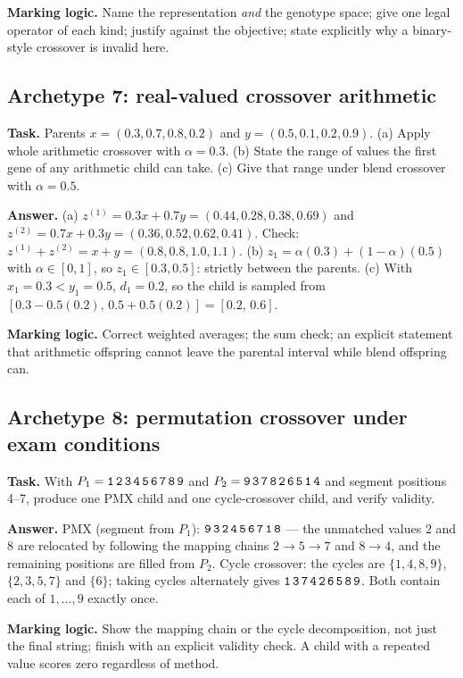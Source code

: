 \documentclass[11pt,a4paper]{article}
\begin{document}
\textbf{Marking logic.} Name the representation \emph{and} the genotype space;
give one legal operator of each kind; justify against the objective; state
explicitly why a binary-style crossover is invalid here.

\subsection{Archetype 7: real-valued crossover arithmetic}
\textbf{Task.} Parents $x=(0.3,0.7,0.8,0.2)$ and $y=(0.5,0.1,0.2,0.9)$.
(a) Apply whole arithmetic crossover with $\alpha=0.3$. (b) State the range of
values the first gene of any arithmetic child can take. (c) Give that range
under blend crossover with $\alpha=0.5$.

\textbf{Answer.}
(a) $z^{(1)}=0.3x+0.7y=(0.44,0.28,0.38,0.69)$ and
$z^{(2)}=0.7x+0.3y=(0.36,0.52,0.62,0.41)$. Check:
$z^{(1)}+z^{(2)}=x+y=(0.8,0.8,1.0,1.1)$.
(b) $z_1=\alpha(0.3)+(1-\alpha)(0.5)$ with $\alpha\in[0,1]$, so
$z_1\in[0.3,0.5]$: strictly between the parents.
(c) With $x_1=0.3<y_1=0.5$, $d_1=0.2$, so the child is sampled from
$[0.3-0.5(0.2),\,0.5+0.5(0.2)]=[0.2,\,0.6]$.

\textbf{Marking logic.} Correct weighted averages; the sum check; an explicit
statement that arithmetic offspring cannot leave the parental interval while
blend offspring can.

\subsection{Archetype 8: permutation crossover under exam conditions}
\textbf{Task.} With $P_1=\texttt{1\,2\,3\,4\,5\,6\,7\,8\,9}$ and
$P_2=\texttt{9\,3\,7\,8\,2\,6\,5\,1\,4}$ and segment positions 4--7, produce
one PMX child and one cycle-crossover child, and verify validity.

\textbf{Answer.} PMX (segment from $P_1$):
$\texttt{9\,3\,2\,4\,5\,6\,7\,1\,8}$ --- the unmatched values $2$ and $8$ are
relocated by following the mapping chains $2\to5\to7$ and $8\to4$, and the
remaining positions are filled from $P_2$. Cycle crossover: the cycles are
$\{1,4,8,9\}$, $\{2,3,5,7\}$ and $\{6\}$; taking cycles alternately gives
$\texttt{1\,3\,7\,4\,2\,6\,5\,8\,9}$. Both contain each of $1,\ldots,9$
exactly once.

\textbf{Marking logic.} Show the mapping chain or the cycle decomposition, not
just the final string; finish with an explicit validity check. A child with a
repeated value scores zero regardless of method.
\end{document}
